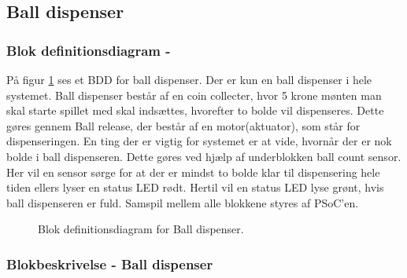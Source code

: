 \documentclass[Arkitektur/System_main.tex]{subfiles}
\begin{document}
\subsection{Ball dispenser} \label{sec:balldispenser_hardware}
\subsubsection{Blok definitionsdiagram - } \label{sec:balldispenser_hardware_bdd}

På figur \ref{fig:balldispenser_hardware_bdd} ses et BDD for ball dispenser. Der er kun en ball dispenser i hele systemet. Ball dispenser består af en coin collecter, hvor 5 krone mønten man skal starte spillet med skal indsættes, hvorefter to bolde vil dispenseres. Dette gøres gennem Ball release, der består af en motor(aktuator), som står for dispenseringen. En ting der er vigtig for systemet er at vide, hvornår der er nok bolde i ball dispenseren. Dette gøres ved hjælp af underblokken ball count sensor. Her vil en sensor sørge for at der er mindst to bolde klar til dispensering hele tiden ellers lyser en status LED rødt. Hertil vil en status LED lyse grønt, hvis ball dispenseren er fuld. Samspil mellem alle blokkene styres af PSoC'en.

\begin{figure}[H]
    \centering
    \caption{Blok definitionsdiagram for Ball dispenser.}
    \label{fig:balldispenser_hardware_bdd}
\end{figure}

\subsubsection{Blokbeskrivelse - Ball dispenser} \label{sec:balldispenser_hardware_block_description}
\end{document}
